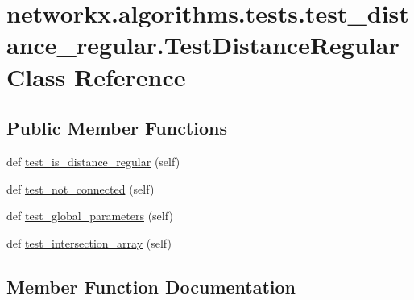 \hypertarget{classnetworkx_1_1algorithms_1_1tests_1_1test__distance__regular_1_1TestDistanceRegular}{}\section{networkx.\+algorithms.\+tests.\+test\+\_\+distance\+\_\+regular.\+Test\+Distance\+Regular Class Reference}
\label{classnetworkx_1_1algorithms_1_1tests_1_1test__distance__regular_1_1TestDistanceRegular}
\subsection*{Public Member Functions}
\begin{DoxyCompactItemize}
\item 
def \hyperlink{classnetworkx_1_1algorithms_1_1tests_1_1test__distance__regular_1_1TestDistanceRegular_a0d980a6b71e1a8b52951ef53990468bb}{test\+\_\+is\+\_\+distance\+\_\+regular} (self)
\item 
def \hyperlink{classnetworkx_1_1algorithms_1_1tests_1_1test__distance__regular_1_1TestDistanceRegular_a8fa1fe8ef729537e3376c771006b0d0d}{test\+\_\+not\+\_\+connected} (self)
\item 
def \hyperlink{classnetworkx_1_1algorithms_1_1tests_1_1test__distance__regular_1_1TestDistanceRegular_aa986287cfda36567f7a09bdf5136a3c6}{test\+\_\+global\+\_\+parameters} (self)
\item 
def \hyperlink{classnetworkx_1_1algorithms_1_1tests_1_1test__distance__regular_1_1TestDistanceRegular_a9283d1d0fbe802fb11fe8e3bc9bc1189}{test\+\_\+intersection\+\_\+array} (self)
\end{DoxyCompactItemize}


\subsection{Member Function Documentation}
\mbox{\label{classnetworkx_1_1algorithms_1_1tests_1_1test__distance__regular_1_1TestDistanceRegular_aa986287cfda36567f7a09bdf5136a3c6}} 
